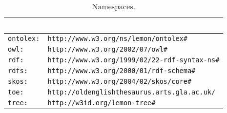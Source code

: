 \begin{center}
\begin{table}[ht]
\centering
\begin{tabular}{|p{}|p{}|} 
\hline
\rowcolor{lightgray}
\textcolor{white}{Prefix} & \textcolor{white}{Namespace} \\  
\hline
 \texttt{ontolex:} & \texttt{http://www.w3.org/ns/lemon/ontolex\#} \\
\hline
 \texttt{owl:} & \texttt{http://www.w3.org/2002/07/owl\#} \\
\hline
 \texttt{rdf:} & \texttt{http://www.w3.org/1999/02/22-rdf-syntax-ns\#} \\
\hline
 \texttt{rdfs:} & \texttt{http://www.w3.org/2000/01/rdf-schema\#} \\
\hline
 \texttt{skos:} & \texttt{http://www.w3.org/2004/02/skos/core\#} \\
\hline
 \texttt{toe:} & \texttt{http://oldenglishthesaurus.arts.gla.ac.uk/} \\
\hline
 \texttt{tree:} & \texttt{http://w3id.org/lemon-tree\#} \\
 \hline
\end{tabular}
\caption{Namespaces.\label{table:Stolk2019b:ns}}
\end{table}
\end{center}

